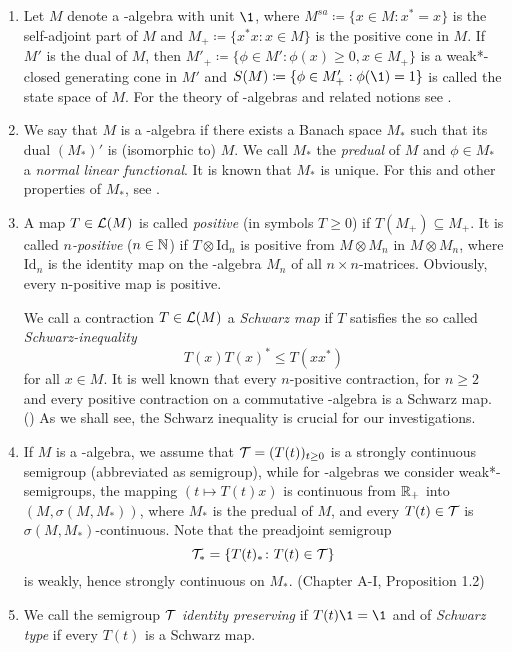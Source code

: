 \begin{enumerate}[1., wide, labelsep=1em]

\item
Let $ M $ denote a \CA-algebra with unit $ \1 $, where 
%
$
	M^{sa} \coloneqq \{x \in M \colon x^{*} = x\} 
$
%
is the self-adjoint part of $ M $ and 
%
$
	M_{+} \coloneqq \{ x^{*}x \colon x \in M\} 
$
%
is the positive cone in $ M $.
If $ M' $ is the dual of $ M $, then 
%
$
	M'_{+} \coloneqq \{\phi \in M' \colon \phi(x) \geq 0, x \in M_{+}\} 
$
%
is a weak*-closed generating cone in $ M' $ and 
%
$
	S(M) \coloneqq \{\phi \in M'_{+}: \phi(\1) = 1\} 
$
%
is called the state space of $ M $. 
For the theory of \CA-algebras and related notions see \citet{Pedersen:1979}.

\item
We say that $ M $ is a \WA-algebra if there exists a Banach space $ M_{*} $ such that its dual $ (M_{*})' $ is (isomorphic to) $ M $.
We call $ M_{*} $ the \emph{predual} of $ M $ and $ \phi \in M_{*} $ a \emph{normal linear functional}.
It is known that $ M_{*} $ is unique. %
For this and other properties of $M_{*} $, see \citet[Chapter III]{takesaki:1979}.

\item
A map $ T \in \mathcal{L}(M) $ is called \emph{positive} (in symbols $ T \geq 0 $) if $ T(M_{+}) \subseteq M_{+} $.
It is called \emph{$n$-positive} ($ n \in \mathbb{N} $) if $ T \otimes \text{Id}_{n} $ is positive from $ M \otimes M_{n} $ in $ M \otimes M_{n} $, where $ \text{Id}_{n} $ is the identity map on the \CA-algebra $ M_{n} $ of all $ n \times n $-matrices.
Obviously, every n-positive map is positive.

We call a contraction $ T \in \mathcal{L}(M) $ a \emph{Schwarz map} if $ T $ satisfies the so called \emph{Schwarz-inequality}
\[
	T(x)T(x)^{*} \leq T(xx^{*}) 
\]
for all $ x \in M $.
It is well known that every $n$-positive contraction, for $ n \geq 2 $ and every positive contraction on a commutative \CA-algebra is a Schwarz map. (\citet[Chapter IV]{takesaki:1979})
As we shall see, the Schwarz inequality is crucial for our investigations.

\item 
If $ M $ is a \CA-algebra, we assume that $ \mathcal{T} = (T(t))_{t \geq 0} $ is a strongly continuous semigroup (abbreviated as semigroup), while for \WA-algebras we consider weak*-semigroups, \ie the mapping $ (t \mapsto T(t)x) $ is continuous from $ \mathbb{R}_{+} $ into $ (M,\sigma(M,M_{*}))$, where $ M_{*} $ is the predual of $ M $, and every $ T(t) \in \mathcal{T} $ is $ \sigma(M,M_{*}) $-continuous.
Note that the preadjoint semigroup
\[
	\mathcal{T}_{*} = \{ T(t)_{*} \colon T(t) \in \mathcal{T} \}
\]
is weakly, hence strongly continuous on $ M_{*} $. (Chapter A-I, Proposition 1.2)%

\item
We call the semigroup $ \mathcal{T} $ \emph{identity preserving} if $ T(t)\1 = \1 $ and of \emph{Schwarz type} if every $ T(t) $ is a Schwarz map.

\end{enumerate}
